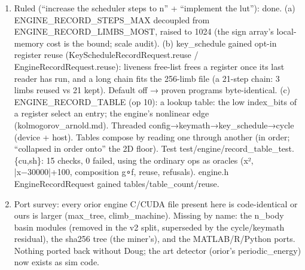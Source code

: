 \begin{enumerate}
\item Ruled (“increase the scheduler steps to n” + “implement the lut”): done. (a) ENGINE\_\allowbreak{}RECORD\_\allowbreak{}STEPS\_\allowbreak{}MAX decoupled from ENGINE\_\allowbreak{}RECORD\_\allowbreak{}LIMBS\_\allowbreak{}MOST, raised to 1024 (the sign array's local-memory cost is the bound; scale audit). (b) key\_\allowbreak{}schedule gained opt-in register reuse (KeyScheduleRecordRequest.reuse / EngineRecordRequest.reuse): liveness free-list frees a register once its last reader has run, and a long chain fits the 256-limb file (a 21-step chain: 3 limbs reused vs 21 kept). Default off → proven programs byte-identical. (c) ENGINE\_\allowbreak{}RECORD\_\allowbreak{}TABLE (op 10): a lookup table: the low index\_\allowbreak{}bits of a register select an entry; the engine's nonlinear edge (kolmogorov\_\allowbreak{}arnold.md). Threaded config→keymath→key\_\allowbreak{}schedule→cycle (device + host). Tables compose by reading one through another (in order; “collapsed in order onto” the 2D floor). Test test/engine/record\_\allowbreak{}table\_\allowbreak{}test.\{cu,sh\}: 15 checks, 0 failed, using the ordinary ops as oracles (x², |x−30000|+100, composition g∘f, reuse, refusals). engine.h EngineRecordRequest gained tables/table\_\allowbreak{}count/reuse.
\item Port survey: every orior engine C/CUDA file present here is code-identical or ours is larger (max\_\allowbreak{}tree, climb\_\allowbreak{}machine). Missing by name: the n\_\allowbreak{}body basin modules (removed in the v2 split, superseded by the cycle/keymath residual), the sha256 tree (the miner's), and the MATLAB/R/Python ports. Nothing ported back without Doug; the art detector (orior's periodic\_\allowbreak{}energy) now exists as sim code.

\end{enumerate}
